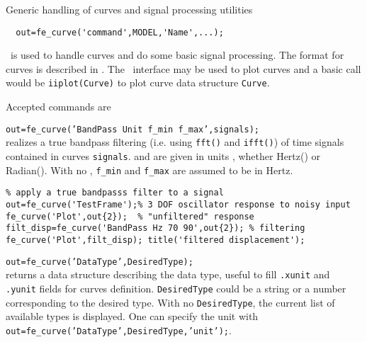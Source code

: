 

\noindent Generic handling of curves and signal processing utilities

\rsyntax\begin{verbatim}
  out=fe_curve('command',MODEL,'Name',...);
\end{verbatim}\nlvs
 


\fecurve\ is used to handle curves and do some basic signal processing. The format for curves is described in . The \iiplot\ interface may be used to plot curves and a basic call would be {\tt iiplot(Curve)} to plot curve data structure {\tt Curve}.

Accepted commands are


{\tt out=fe\_curve('BandPass {\ti Unit f\_min f\_max}',signals);} \\
realizes a true bandpass filtering (i.e. using {\tt fft()} and {\tt ifft()}) of time signals contained in curves {\tt signals}. {\ti {}} and {\ti {}} are given in units {\ti {}}, whether Hertz() or Radian(). With no {\ti {}}, {\tt f\_min} and {\tt f\_max} are assumed to be in Hertz. 

\begin{verbatim}
% apply a true bandpasss filter to a signal
out=fe_curve('TestFrame');% 3 DOF oscillator response to noisy input
fe_curve('Plot',out{2});  % "unfiltered" response
filt_disp=fe_curve('BandPass Hz 70 90',out{2}); % filtering 
fe_curve('Plot',filt_disp); title('filtered displacement');
\end{verbatim}%



{\tt out=fe\_curve('DataType',DesiredType);} \\
returns a data structure describing the data type, useful to fill {\tt .xunit} and {\tt .yunit} fields for curves definition. {\tt DesiredType} could be a string or a number corresponding to the desired type.  With no {\tt DesiredType}, the current list of available types is displayed. One can specify the unit with {\tt out=fe\_curve('DataType',DesiredType,'unit');}.

